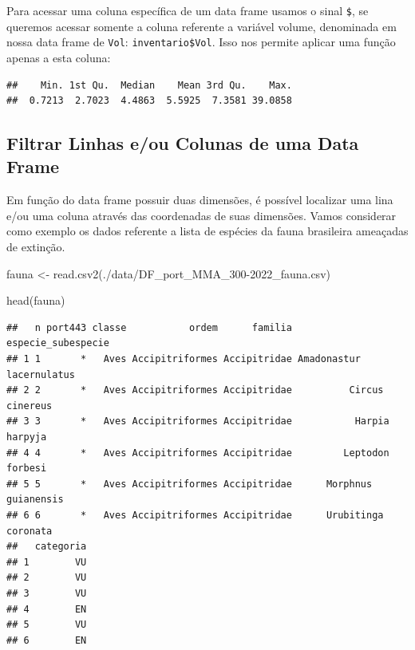 \documentclass[
]{article}
\newenvironment{Shaded}{\begin{snugshade}}{\end{snugshade}}
\newcommand{\CommentTok}[1]{\textcolor[rgb]{0.56,0.35,0.01}{\textit{#1}}}
\newcommand{\FunctionTok}[1]{\textcolor[rgb]{0.00,0.00,0.00}{#1}}
\newcommand{\NormalTok}[1]{#1}
\newcommand{\OtherTok}[1]{\textcolor[rgb]{0.56,0.35,0.01}{#1}}
\newcommand{\SpecialCharTok}[1]{\textcolor[rgb]{0.00,0.00,0.00}{#1}}
\newcommand{\StringTok}[1]{\textcolor[rgb]{0.31,0.60,0.02}{#1}}
\begin{document}
Para acessar uma coluna específica de um data frame usamos o sinal
\texttt{\$}, se queremos acessar somente a coluna referente a variável
volume, denominada em nossa data frame de \texttt{Vol}:
\texttt{inventario\$Vol}. Isso nos permite aplicar uma função apenas a
esta coluna:

\begin{Shaded}
\end{Shaded}

\begin{verbatim}
##    Min. 1st Qu.  Median    Mean 3rd Qu.    Max. 
##  0.7213  2.7023  4.4863  5.5925  7.3581 39.0858
\end{verbatim}

\hypertarget{filtrar-linhas-eou-colunas-de-uma-data-frame}{%
\subsection{Filtrar Linhas e/ou Colunas de uma Data
Frame}\label{filtrar-linhas-eou-colunas-de-uma-data-frame}}

Em função do data frame possuir duas dimensões, é possível localizar uma
lina e/ou uma coluna através das coordenadas de suas dimensões. Vamos
considerar como exemplo os dados referente a lista de espécies da fauna
brasileira ameaçadas de extinção.

\begin{Shaded}
\begin{Highlighting}[]
\NormalTok{fauna }\OtherTok{\textless{}{-}} \FunctionTok{read.csv2}\NormalTok{(}\StringTok{\textquotesingle{}./data/DF\_port\_MMA\_300{-}2022\_fauna.csv\textquotesingle{}}\NormalTok{)}

\FunctionTok{head}\NormalTok{(fauna)}
\end{Highlighting}
\end{Shaded}

\begin{verbatim}
##   n port443 classe           ordem      familia       especie_subespecie
## 1 1       *   Aves Accipitriformes Accipitridae Amadonastur lacernulatus
## 2 2       *   Aves Accipitriformes Accipitridae          Circus cinereus
## 3 3       *   Aves Accipitriformes Accipitridae           Harpia harpyja
## 4 4       *   Aves Accipitriformes Accipitridae         Leptodon forbesi
## 5 5       *   Aves Accipitriformes Accipitridae      Morphnus guianensis
## 6 6       *   Aves Accipitriformes Accipitridae      Urubitinga coronata
##   categoria
## 1        VU
## 2        VU
## 3        VU
## 4        EN
## 5        VU
## 6        EN
\end{verbatim}
\end{document}
